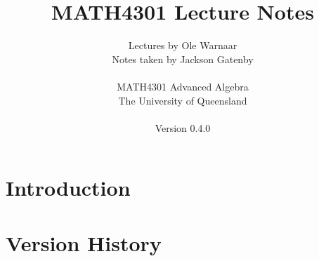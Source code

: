 \documentclass[a4paper]{report}
\title{MATH4301 Lecture Notes}
\author{Lectures by Ole Warnaar\\
Notes taken by Jackson Gatenby\\
\\
MATH4301 Advanced Algebra\\
The University of Queensland\\
\\
Version 0.4.0}
\begin{document}
\maketitle
\tableofcontents



\chapter{Introduction}






\appendix

\chapter{Version History}

\end{document}
